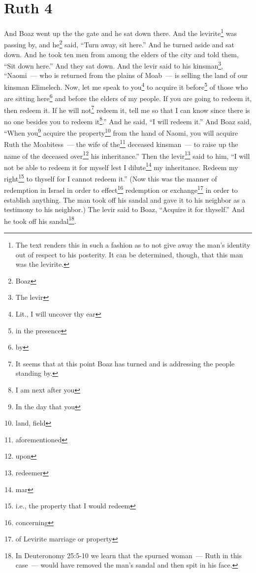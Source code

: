 \section{Ruth 4}\label{Ruth 4}
\begin{enumerate}
     And Boaz went up the the gate and he sat down there. And the levirite\footnote{The text renders this in such a fashion as to not give away the man's identity out of respect to his posterity. It can be determined, though, that this man was the levirite.} was passing by, and he\footnote{Boaz} said, ``Turn away, sit here.'' And he turned aside and sat down.%
     And he took ten men from among the elders of the city and told them, ``Sit down here.'' And they sat down.%
     And the levir said to his kinsman\footnote{The levir}, ``Naomi~--- who is returned from the plains of Moab~--- is selling the land of our kinsman Elimelech.%
     Now, let me speak to you\footnote{Lit., I will uncover thy ear} to acquire it before\footnote{in the presence} of those who are sitting here\footnote{by} and before the elders of my people. If you are going to redeem it, then redeem it. If he will not\footnote{It seems that at this point Boaz has turned and is addressing the people standing by.} redeem it, tell me so that I can know since there is no one besides you to redeem it\footnote{I am next after you}.'' And he said, ``I will redeem it.''%
     And Boaz said, ``When you\footnote{In the day that you} acquire the property\footnote{land, field} from the hand of Naomi, you will acquire Ruth the Moabitess~--- the wife of the\footnote{aforementioned} deceased kinsman~--- to raise up the name of the deceased over\footnote{upon} his inheritance.''%
     Then the levir\footnote{redeemer} said to him, ``I will not be able to redeem it for myself lest I dilute\footnote{mar} my inheritance. Redeem my right\footnote{i.e., the property that I would redeem} to thyself for I cannot redeem it.''%
     (Now this was the manner of redemption in Israel in order to effect\footnote{concerning} redemption or exchange\footnote{of Levirite marriage or property} in order to establish anything. The man took off his sandal and gave it to his neighbor as a testimony to his neighbor.)%
     The levir said to Boaz, ``Acquire it for thyself.'' And he took off his sandal\footnote{In Deuteronomy 25:5-10 we learn that the spurned woman~--- Ruth in this case~--- would have removed the man's sandal and then spit in his face.}.%

\end{enumerate}
